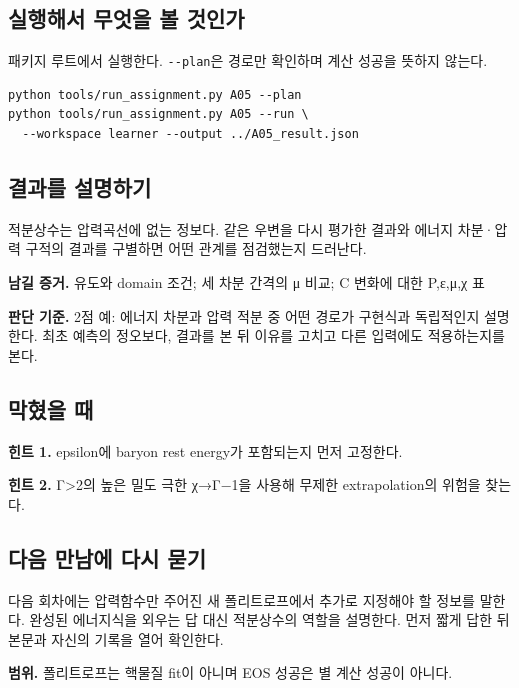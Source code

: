\documentclass[
  10pt,
  a4paper,
]{article}
\begin{document}
\newpage

\subsection{실행해서 무엇을 볼
것인가}\label{uxc2e4uxd589uxd574uxc11c-uxbb34uxc5c7uxc744-uxbcfc-uxac83uxc778uxac00}

패키지 루트에서 실행한다. \texttt{-\/-plan}은 경로만 확인하며 계산
성공을 뜻하지 않는다.

\begin{verbatim}
python tools/run_assignment.py A05 --plan
python tools/run_assignment.py A05 --run \
  --workspace learner --output ../A05_result.json
\end{verbatim}

\subsection{결과를
설명하기}\label{uxacb0uxacfcuxb97c-uxc124uxba85uxd558uxae30}

적분상수는 압력곡선에 없는 정보다. 같은 우변을 다시 평가한 결과와 에너지
차분·압력 구적의 결과를 구별하면 어떤 관계를 점검했는지 드러난다.

\textbf{남길 증거.} 유도와 domain 조건; 세 차분 간격의 μ 비교; C 변화에
대한 P,ε,μ,χ 표

\textbf{판단 기준.} 2점 예: 에너지 차분과 압력 적분 중 어떤 경로가
구현식과 독립적인지 설명한다. 최초 예측의 정오보다, 결과를 본 뒤 이유를
고치고 다른 입력에도 적용하는지를 본다.

\subsection{막혔을 때}\label{uxb9c9uxd614uxc744-uxb54c}

\textbf{힌트 1.} epsilon에 baryon rest energy가 포함되는지 먼저
고정한다.

\textbf{힌트 2.} Γ\textgreater2의 높은 밀도 극한 χ→Γ−1을 사용해 무제한
extrapolation의 위험을 찾는다.

\subsection{다음 만남에 다시
묻기}\label{uxb2e4uxc74c-uxb9ccuxb0a8uxc5d0-uxb2e4uxc2dc-uxbb3buxae30}

다음 회차에는 압력함수만 주어진 새 폴리트로프에서 추가로 지정해야 할
정보를 말한다. 완성된 에너지식을 외우는 답 대신 적분상수의 역할을
설명한다. 먼저 짧게 답한 뒤 본문과 자신의 기록을 열어 확인한다.

\textbf{범위.} 폴리트로프는 핵물질 fit이 아니며 EOS 성공은 별 계산
성공이 아니다.
\end{document}
